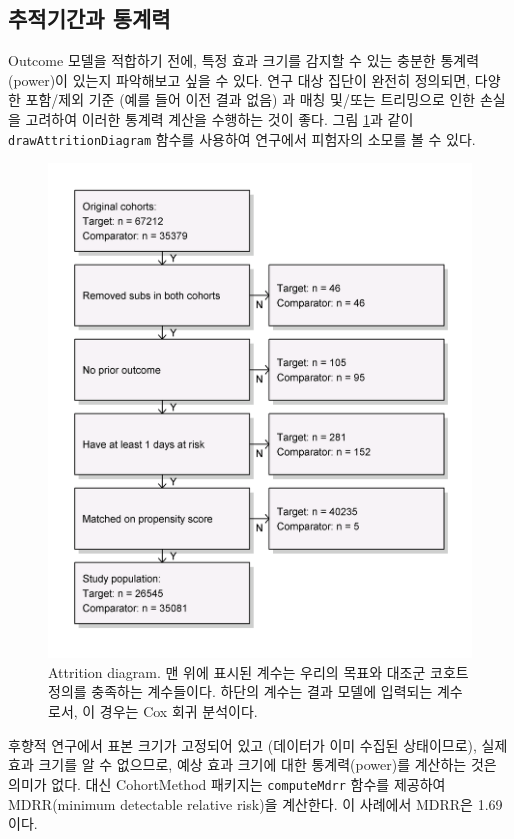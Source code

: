 \documentclass[11pt]{book}
\theoremstyle{definition}
\theoremstyle{definition}
\theoremstyle{definition}
\theoremstyle{remark}
\begin{document}
\subsection{추적기간과 통계력}\label{-}

Outcome 모델을 적합하기 전에, 특정 효과 크기를 감지할 수 있는 충분한
통계력(power)이 있는지 파악해보고 싶을 수 있다. 연구 대상 집단이 완전히
정의되면, 다양한 포함/제외 기준 (예를 들어 이전 결과 없음) 과 매칭
및/또는 트리밍으로 인한 손실을 고려하여 이러한 통계력 계산을 수행하는
것이 좋다. 그림 \ref{fig:attrition}과 같이 \texttt{drawAttritionDiagram}
함수를 사용하여 연구에서 피험자의 소모를 볼 수 있다.

\begin{figure}

{\centering \includegraphics[width=0.7\linewidth]{images/PopulationLevelEstimation/attrition} 

}

\caption{Attrition diagram. 맨 위에 표시된 계수는 우리의 목표와 대조군 코호트 정의를 충족하는 계수들이다. 하단의 계수는 결과 모델에 입력되는 계수로서, 이 경우는 Cox 회귀 분석이다.}\label{fig:attrition}
\end{figure}

후향적 연구에서 표본 크기가 고정되어 있고 (데이터가 이미 수집된
상태이므로), 실제 효과 크기를 알 수 없으므로, 예상 효과 크기에 대한
통계력(power)를 계산하는 것은 의미가 없다. 대신 CohortMethod 패키지는
\texttt{computeMdrr} 함수를 제공하여 MDRR(minimum detectable relative
risk)을 계산한다. 이 사례에서 MDRR은 1.69이다.
 
\end{document}
